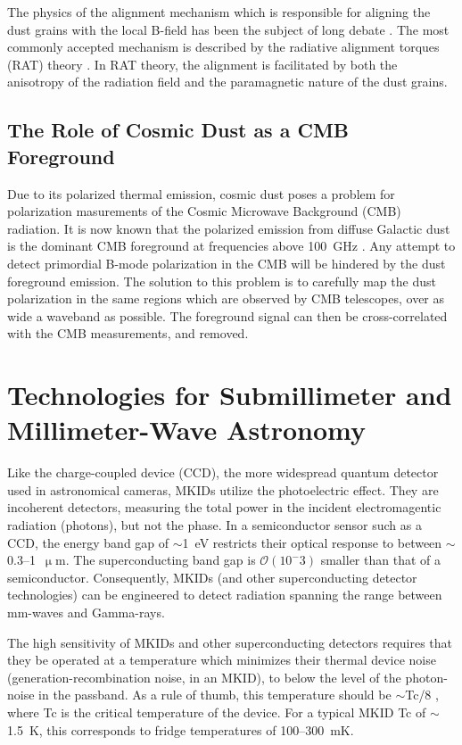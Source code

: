 The physics of the alignment mechanism which is responsible for aligning the dust grains with the local B-field has been the subject of long debate \citep{andersson2015interstellar}. The most commonly accepted mechanism is described by the radiative alignment torques (RAT) theory \citep{lazarian2007radiative}. In RAT theory, the alignment is facilitated by both the anisotropy of the radiation field and the paramagnetic nature of the dust grains.

\subsection{The Role of Cosmic Dust as a CMB Foreground}

Due to its polarized thermal emission, cosmic dust poses a problem for polarization masurements of the Cosmic Microwave Background (CMB) radiation. It is now known that the polarized emission from diffuse Galactic dust is the dominant CMB foreground at frequencies above 100~GHz \citep{adam2016planck}. Any attempt to detect primordial B-mode polarization in the CMB will be hindered by the dust foreground emission. The solution to this problem is to carefully map the dust polarization in the same regions which are observed by CMB telescopes, over as wide a waveband as possible. The foreground signal can then be cross-correlated with the CMB measurements, and removed.

\section{Technologies for Submillimeter and Millimeter-Wave Astronomy}

Like the charge-coupled device (CCD), the more widespread quantum detector used in astronomical cameras, MKIDs utilize the photoelectric effect. They are incoherent detectors, measuring the total power in the incident electromagentic radiation (photons), but not the phase. In a semiconductor sensor such as a CCD, the energy band gap of $\sim$1~eV restricts their optical response to between $\sim$0.3--1~$\upmu$m. The superconducting band gap is $\mathcal{O}(10^-3)$ smaller than that of a semiconductor. Consequently, MKIDs (and other superconducting detector technologies) can be engineered to detect radiation spanning the range between mm-waves and Gamma-rays.

The high sensitivity of MKIDs and other superconducting detectors requires that they be operated at a temperature which minimizes their thermal device noise (generation-recombination noise, in an MKID), to below the level of the photon-noise in the passband. As a rule of thumb, this temperature should be $\sim$\gls{Tc}/8 \citep{mazin2013arcons}, where \gls{Tc} is the critical temperature of the device. For a typical MKID \gls{Tc} of $\sim$1.5~K, this corresponds to fridge temperatures of 100--300~mK.

